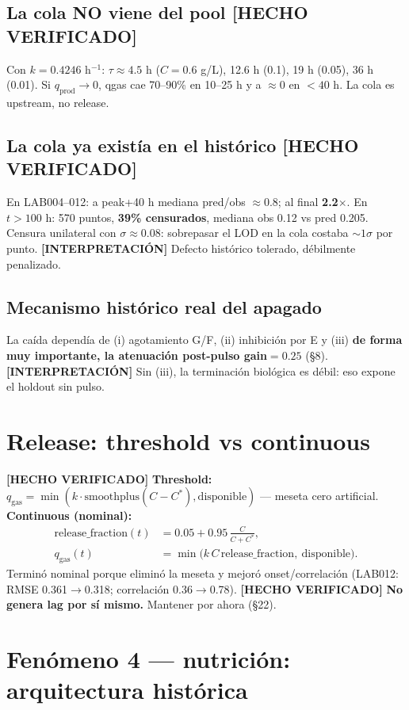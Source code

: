 \documentclass[11pt,a4paper]{article}
\newcommand{\hecho}{\textcolor{hecho}{\textbf{[HECHO VERIFICADO]}}}
\newcommand{\interp}{\textcolor{interp}{\textbf{[INTERPRETACI\'ON]}}}
\begin{document}
\subsection{La cola NO viene del pool \hecho}
Con $k=0.4246$ h$^{-1}$: $\tau \approx 4.5$ h ($C=0.6$ g/L), 12.6 h (0.1), 19 h (0.05), 36 h (0.01). Si $q_{\mathrm{prod}}\to 0$, qgas cae 70--90\% en 10--25 h y a $\approx$0 en $<40$ h. La cola es upstream, no release.

\subsection{La cola ya exist\'ia en el hist\'orico \hecho}
En LAB004--012: a peak+40 h mediana pred/obs $\approx 0.8$; al final \textbf{2.2$\times$}. En $t>100$ h: 570 puntos, \textbf{39\% censurados}, mediana obs 0.12 vs pred 0.205. Censura unilateral con $\sigma\approx 0.08$: sobrepasar el LOD en la cola costaba ${\sim}1\sigma$ por punto. \interp{} Defecto hist\'orico tolerado, d\'ebilmente penalizado.

\subsection{Mecanismo hist\'orico real del apagado}
La ca\'ida depend\'ia de (i) agotamiento G/F, (ii) inhibici\'on por E y (iii) \textbf{de forma muy importante, la atenuaci\'on post-pulso gain$=0.25$} (\S8). \interp{} Sin (iii), la terminaci\'on biol\'ogica es d\'ebil: eso expone el holdout sin pulso.

\section{Release: threshold vs continuous}

\hecho{} \textbf{Threshold:} $q_{\mathrm{gas}} = \min(k\cdot\mathrm{smoothplus}(C - C^*), \text{disponible})$ --- meseta cero artificial. \textbf{Continuous (nominal):}
\begin{align}
\text{release\_fraction}(t) &= 0.05 + 0.95\,\frac{C}{C+C^*},\\
q_{\mathrm{gas}}(t) &= \min\!\big(k\, C\, \text{release\_fraction},\ \text{disponible}\big).
\end{align}
Termin\'o nominal porque elimin\'o la meseta y mejor\'o onset/correlaci\'on (LAB012: RMSE 0.361$\to$0.318; correlaci\'on 0.36$\to$0.78). \hecho{} \textbf{No genera lag por s\'i mismo.} Mantener por ahora (\S22).

\section{Fen\'omeno 4 --- nutrici\'on: arquitectura hist\'orica}
\end{document}
